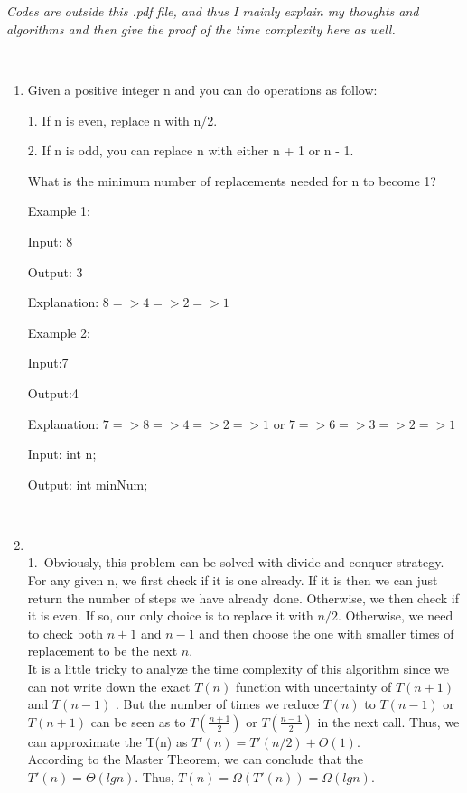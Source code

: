 \documentclass[12pt,a4paper]{article}
\makeatletter
\newtheorem*{solution}{Solution}
\renewenvironment{solution}[1][Solution] {\par\pushQED{\qed}\normalfont\topsep6\p@\@plus6\p@\relax\trivlist\item[\hskip\labelsep\bfseries#1\@addpunct{.}]\ignorespaces}{\popQED\endtrivlist\@endpefalse} \makeatother
\makeatother
\begin{document}
\noindent

\noindent{}

~\\~\\\emph{Codes are outside this .pdf file, and thus I mainly explain my thoughts and algorithms and then give the proof of the time complexity here as well.}

~\\
\begin{enumerate}

\item Given a positive integer n and you can do operations as follow:

1. If n is even, replace n with n/2.

2. If n is odd, you can replace n with either n + 1 or n - 1.

What is the minimum number of replacements needed for n to become 1?

Example 1:

Input: 8

Output: 3

Explanation: $8 => 4 => 2 => 1$

Example 2:

Input:7

Output:4

Explanation: $7 => 8 => 4 => 2 => 1$ or $7 => 6 => 3 => 2 => 1$

Input: int n;

Output: int minNum;


~\\



\begin{solution}
~\\


1.~Obviously, this problem can be solved with divide-and-conquer strategy. For any given n, we first check if it is one already. If it is then we can just return the number of steps we have already done. Otherwise, we then check if it is even. If so, our only choice is to replace it with $n/2$. Otherwise, we need to check both $n+1$  and $n-1$ and then choose the one with smaller times of replacement to be the next $n$.
~\\
It is a little tricky to analyze the time complexity of this algorithm since we can not write down the exact $T(n)$ function with uncertainty of $T(n+1)$ and $T(n-1)$ . But the number of times we reduce $T(n)$ to $T(n-1)$ or $T(n+1)$ can be seen as to $T(\frac{n+1}2)$ or $T(\frac{n-1}2)$ in the next call. Thus, we can approximate the T(n) as $T'(n) = T'(n/2) + O(1)$. ~\\
According to the Master Theorem, we can conclude that the $T'(n) = \Theta (lgn)$. Thus, $T(n) = \Omega (T'(n)) = \Omega (lgn)$.


\end{solution}
\end{enumerate}
\end{document}
